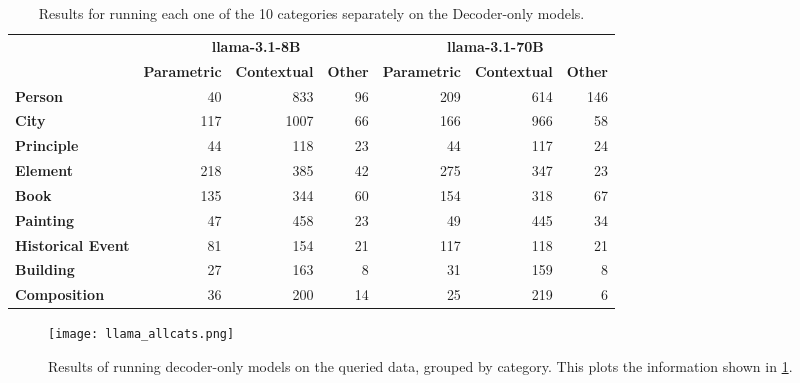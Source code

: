 \begin{table}[htbp]
	\centering
	\footnotesize
	\begin{tabular}{>{\bfseries}l | r r r | r r r}
		\toprule
			& \multicolumn{3}{c|}{\ttfamily \bfseries llama-3.1-8B} & \multicolumn{3}{c}{\ttfamily \bfseries llama-3.1-70B} \\
			& \bfseries Parametric & \bfseries Contextual & \bfseries Other & \bfseries Parametric & \bfseries Contextual & \bfseries Other \\
		\midrule
			Person           &  40 &  833 & 96 & 209 & 614 & 146 \\
			City             & 117 & 1007 & 66 & 166 & 966 &  58 \\
			Principle        &  44 &  118 & 23 &  44 & 117 &  24 \\
			Element          & 218 &  385 & 42 & 275 & 347 &  23 \\
			Book             & 135 &  344 & 60 & 154 & 318 &  67 \\
			Painting         &  47 &  458 & 23 &  49 & 445 &  34 \\
			Historical Event &  81 &  154 & 21 & 117 & 118 &  21 \\
			Building         &  27 &  163 &  8 &  31 & 159 &   8 \\
			Composition      &  36 &  200 & 14 &  25 & 219 &   6 \\
		\bottomrule
	\end{tabular}
	\caption{Results for running each one of the 10 categories separately on the Decoder-only models.}
	\label{llama_cats_table}
\end{table}

\begin{figure}[p]
	\centering
	\texttt{[image: llama\_allcats.png]}
	\caption{Results of running decoder-only models on the queried data, grouped by category. This plots the information shown in \cref{llama_cats_table}.}
	\label{llama_cats_result}
\end{figure}

